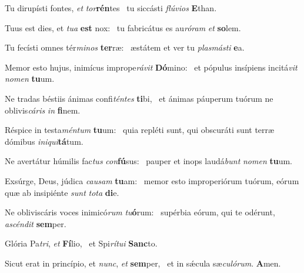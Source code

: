 \item Tu dirupísti fontes, \textit{et} \textit{tor}\textbf{rén}tes~\psstar{} tu siccásti \textit{flúvios} \textbf{E}than.
\item Tuus est dies, et \textit{tua} \textbf{est} nox:~\psstar{} tu fabricátus es au\textit{róram} \textit{et} \textbf{so}lem.
\item Tu fecísti omnes tér\textit{minos} \textbf{ter}ræ:~\psstar{} æstátem et ver tu \textit{plasmásti} \textbf{e}a.
\item Memor esto hujus, inimícus imprope\textit{rávit} \textbf{Dó}mino:~\psstar{} et pópulus insípiens incitá\textit{vit} \textit{nomen} \textbf{tu}um.
\item Ne tradas béstiis ánimas confi\textit{téntes} \textbf{ti}bi,~\psstar{} et ánimas páuperum tuórum ne oblivis\textit{cáris} \textit{in} \textbf{fi}nem.
\item Réspice in testa\textit{méntum} \textbf{tu}um:~\psstar{} quia repléti sunt, qui obscuráti sunt terræ dómibus \textit{iniqui}\textbf{tá}tum.
\item Ne avertátur húmilis fac\textit{tus} \textit{con}\textbf{fú}sus:~\psstar{} pauper et inops laudá\textit{bunt} \textit{nomen} \textbf{tu}um.
\item Exsúrge, Deus, júdica \textit{causam} \textbf{tu}am:~\psstar{} memor esto improperiórum tuórum, eórum quæ ab insipiénte \textit{sunt} \textit{tota} \textbf{di}e.
\item Ne obliviscáris voces inimicó\textit{rum} \textit{tu}\textbf{ó}rum:~\psstar{} supérbia eórum, qui te odérunt, \textit{ascéndit} \textbf{sem}per.
\item Glória Pa\textit{tri}, \textit{et} \textbf{Fí}lio,~\psstar{} et Spi\textit{rítui} \textbf{Sanc}to.
\item Sicut erat in princípio, et \textit{nunc}, \textit{et} \textbf{sem}per,~\psstar{} et in sǽcula sæ\textit{culórum}. \textbf{A}men.
